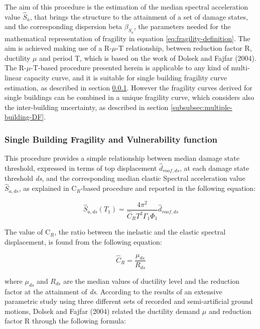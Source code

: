 The aim of this procedure is the estimation of the median spectral acceleration value $\hat{S}_a$, that brings the structure to the attainment of a set of damage states, and the corresponding dispersion beta $\beta_{S_a}$, the parameters needed for the mathematical representation of fragility in equation \ref{eq:fragility-definition}. The aim is achieved making use of a R-$\mu$-T relationship, between reduction factor R, ductility $\mu$ and period T, which is based on the work of Dolsek and Fajfar (2004). The R-$\mu$-T-based procedure presented herein is applicable to any kind of multi-linear capacity curve, and it is suitable for single building fragility curve estimation, as described in section \ref{subsubsec:single-building-DF}. However the fragility curves derived for single buildings can be combined in a unique fragility curve, which considers also the inter-building uncertainty, as described in section \ref{subsubsec:multiple-building-DF}.

\subsubsection{Single Building Fragility and Vulnerability function}
\label{subsubsec:single-building-DF}
This procedure provides a simple relationship between median damage state threshold, expressed in terms of top displacement $\hat{d}_{roof, ds}$, at each damage state threshold \textit{ds}, and the corresponding median elastic Spectral acceleration value $\hat{S}_{a, ds}$, as explained in C$_{R}$-based procedure and reported in the following equation:

\begin{equation}
\hat{S}_{a,ds}(T_1) = \frac{4 \pi^2}{\hat{C}_R T^2 \Gamma_1 \Phi_1} \hat{d}_{roof, ds}
\label{eq:basic_DF}
\end{equation}

The value of C$_R$, the ratio between the inelastic and the elastic spectral displacement, is found from the following equation:

\begin{equation}
\hat{C}_{R} = \frac{\mu_{ds}}{R_{ds}}
\label{eq:Cr_DF}
\end{equation}

where $\mu_{ds}$ and $R_{ds}$ are the median values of ductility level and the reduction factor at the attainment of \textit{ds}. According to the results of an extensive parametric study using three different sets of recorded and semi-artificial ground motions, Dolsek and Fajfar (2004) related the ductility demand $\mu$ and reduction factor R through the following formula:

